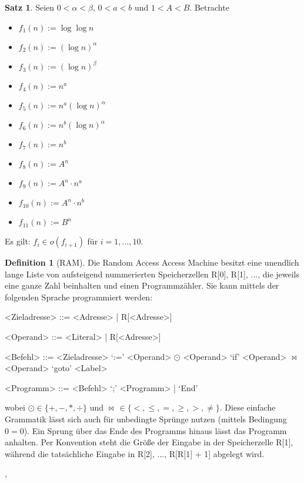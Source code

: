 \documentclass[a4paper,10pt,landscape]{article}
\theoremstyle{definition}
\newtheorem*{defn}{Definition}
\newtheorem*{satz}{Satz}
\theoremstyle{remark}
\begin{document}
\begin{multicols}{3}
\begin{satz}
  Seien $0 < \alpha < \beta$, $0 < a < b$ und $1 < A < B$. Betrachte
  \begin{multicols}{3}
    \begin{itemize}
      \item $f_1(n) := \log \log n$
      \item $f_2(n) := (\log n)^\alpha$
      \item $f_3(n) := (\log n)^\beta$
      \item $f_4(n) := n^a$
      \item $f_5(n) := n^a (\log n)^\alpha$
      \item $f_6(n) := n^b (\log n)^\alpha$
      \item $f_7(n) := n^b$
      \item $f_8(n) := A^n$
      \item $f_9(n) := A^n \cdot n^a$
      \item $f_{10}(n) := A^n \cdot n^b$
      \item $f_{11}(n) := B^n$
    \end{itemize}
  \end{multicols}
  Es gilt: $f_i \in o(f_{i+1})$ für $i = 1, ..., 10$.
\end{satz}


\begin{defn}[RAM]
  Die Random Access Access Machine besitzt eine unendlich lange Liste von aufsteigend nummerierten Speicherzellen R[0], R[1], ..., die jeweils eine ganze Zahl beinhalten und einen Programmzähler. Sie kann mittels der folgenden Sprache programmiert werden:
  \begin{grammar}
    <Zieladresse> ::= <Adresse> | R[<Adresse>]

    <Operand> ::= <Literal> | R[<Adresse>]

    <Befehl> ::= <Zieladresse> `:=' <Operand> $\odot$ <Operand>
    \alt `if' <Operand> $\bowtie$ <Operand> `goto' <Label>

    <Programm> ::= <Befehl> `;' <Programm> | `End'
  \end{grammar}
  wobei $\odot \in \{ +, -, *, \div \}$ und $\bowtie \, \in \{ <, \leq, =, \geq, >, \not= \}$. Diese einfache Grammatik lässt sich auch für unbedingte Sprünge nutzen (mittels Bedingung $0 = 0$). Ein Sprung über das Ende des Programms hinaus lässt das Programm anhalten. Per Konvention steht die Größe der Eingabe in der Speicherzelle R[1], während die tatsächliche Eingabe in R[2], ..., R[R[1] + 1] abgelegt wird.
\end{defn},


\end{multicols}
\end{document}
